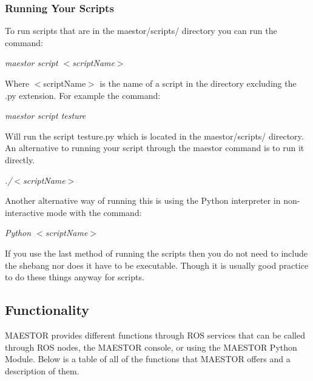 \documentclass[12pt]{article}
\begin{document}
\subsubsection{Running Your Scripts}


To run scripts that are in the maestor/scripts/ directory you can run the command: 

\begin{center}
	\textit{maestor script $<$scriptName$>$}
\end{center}

Where $<$scriptName$>$ is the name of a script in the directory excluding the .py extension. For example the command:

\begin{center}
	\textit{maestor script testure}
\end{center}

Will run the script testure.py which is located in the maestor/scripts/ directory. An alternative to running your script through the maestor command is to run it directly. 

\begin{center}
	\textit{./$<$scriptName$>$}
\end{center}

Another alternative way of running this is using the Python interpreter in non-interactive mode with the command:

\begin{center}
	\textit{Python $<$scriptName$>$}
\end{center}

If you use the last method of running the scripts then you do not need to include the shebang nor does it have to be executable. Though it is usually good practice to do these things anyway for scripts. 

\subsection{Functionality}

MAESTOR provides different functions through ROS services that can be called through ROS nodes, the MAESTOR console, or using the MAESTOR Python Module. Below is a table of all of the functions that MAESTOR offers and a description of them. 
\end{document}
